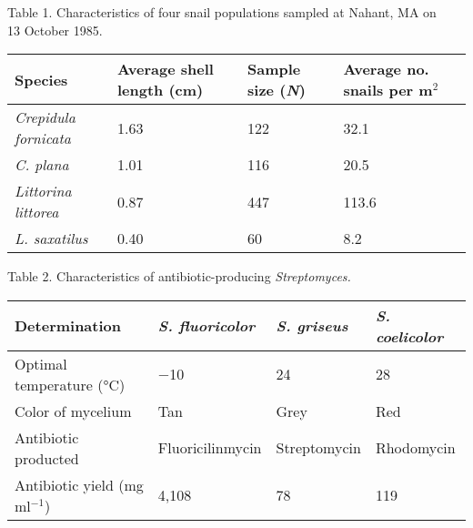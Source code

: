 \documentclass[12pt]{article}
\begin{document}
\begin{enumerate}
	Table 1.  Characteristics of four snail populations sampled at Nahant, MA on\\ 13 October 1985.
	
	\begin{tabular}{@{}lR{1.0in}R{1.0in}R{1.0in}@{}}
	\toprule
	Species & Average shell length (cm) & Sample size (\textit{N}) & Average no. snails per m$^2$ \\
	\midrule
	\textit{Crepidula fornicata}	&	1.63	&	122	&	32.1 \\
	\textit{C. plana}	&	1.01	&	116	&	20.5 \\
	\textit{Littorina littorea}	&	0.87	&	447	&	113.6 \\
	\textit{L. saxatilus}	&	0.40	&	60	&	8.2 \\
	\bottomrule
	\end{tabular}	
	
	\smallskip
	
%	

	Table 2. Characteristics of antibiotic-producing \textit{Streptomyces.}

\noindent\begin{tabular}{@{}L{1.75in}L{1in}L{1in}L{1in}@{}}
	\toprule
	Determination & \textit{S. fluoricolor} & \textit{S. griseus} & \textit{S. coelicolor} \\
	\midrule
	Optimal temperature (°C)	&	$-$10	&	24	&	28	\\
	Color of mycelium	&	Tan	&	Grey	&	Red	\\
	Antibiotic producted	&	Fluoricilinmycin	&	Streptomycin	&	Rhodomycin	\\
	Antibiotic yield (mg ml$^{-1}$)	&	4,108	&	78	&	119	\\
	\bottomrule
\end{tabular}


\end{enumerate}
\end{document}

